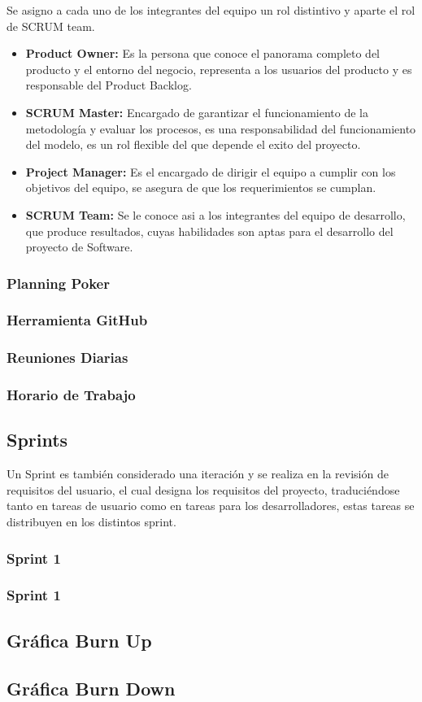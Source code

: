 Se asigno a cada uno de los integrantes del equipo un rol distintivo y aparte el rol de SCRUM team.

\begin{itemize}
	\item \textbf{Product Owner:} Es la persona que conoce el panorama completo del producto y el entorno del negocio, representa a los usuarios del producto y es responsable del Product Backlog.
	\item \textbf{SCRUM Master:} Encargado de garantizar el funcionamiento de la metodología y evaluar los procesos, es una responsabilidad del funcionamiento del modelo, es un rol flexible del que depende el exito del proyecto.
	\item \textbf{Project Manager:} Es el encargado de dirigir el equipo a cumplir con los objetivos del equipo, se asegura de que los requerimientos se cumplan.
	\item \textbf{SCRUM Team:} Se le conoce asi a los integrantes del equipo de desarrollo, que produce resultados, cuyas habilidades son aptas para el desarrollo del proyecto de Software.
\end{itemize}




\subsubsection{Planning Poker}

\subsubsection{Herramienta GitHub}

\subsubsection{Reuniones Diarias}

\subsubsection{Horario de Trabajo}

\subsection{Sprints}

Un Sprint es también considerado una iteración y se realiza en la revisión de requisitos del usuario, el cual designa los requisitos del proyecto, traduciéndose tanto en tareas de usuario como en tareas para los desarrolladores, estas tareas se distribuyen en los distintos sprint.


\subsubsection{Sprint 1}

\subsubsection{Sprint 1}

\subsection{Gráfica Burn Up}

\subsection{Gráfica Burn Down}
